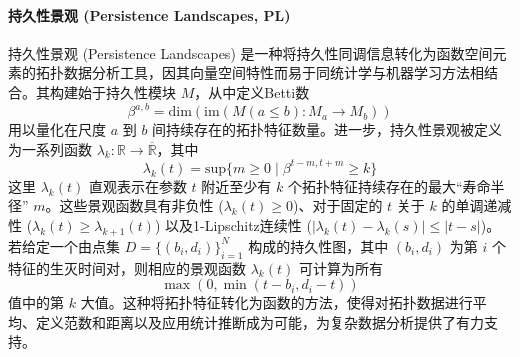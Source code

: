             \paragraph{持久性景观 (Persistence Landscapes, PL)}
                \label{sec:feat_pl}
                持久性景观 (Persistence Landscapes) \cite{1} 是一种将持久性同调信息转化为函数空间元素的拓扑数据分析工具，因其向量空间特性而易于同统计学与机器学习方法相结合。其构建始于持久性模块 $M$，从中定义Betti数
                \begin{equation}
                \label{eq:betti_number} %
                \beta^{a,b} = \text{dim}(\text{im}(M(a \le b): M_a \rightarrow M_b))
                \end{equation}
                用以量化在尺度 $a$ 到 $b$ 间持续存在的拓扑特征数量。进一步，持久性景观被定义为一系列函数 $\lambda_k: \mathbb{R} \rightarrow \overline{\mathbb{R}}$，其中
                \begin{equation}
                \label{eq:lambda_k_definition}
                \lambda_k(t) = \text{sup}\{m \ge 0 \mid \beta^{t-m,t+m} \ge k\}
                \end{equation}
                这里 $\lambda_k(t)$ 直观表示在参数 $t$ 附近至少有 $k$ 个拓扑特征持续存在的最大“寿命半径” $m$。这些景观函数具有非负性 ($\lambda_k(t) \ge 0$)、对于固定的 $t$ 关于 $k$ 的单调递减性 ($\lambda_k(t) \ge \lambda_{k+1}(t)$) 以及1-Lipschitz连续性 ($|\lambda_k(t) - \lambda_k(s)| \le |t-s|$)。若给定一个由点集 $D = \{(b_i, d_i)\}_{i=1}^N$ 构成的持久性图，其中 $(b_i,d_i)$ 为第 $i$ 个特征的生灭时间对，则相应的景观函数 $\lambda_k(t)$ 可计算为所有
                \begin{equation}
                \label{eq:lambda_k_from_diagram_core}
                \max(0, \min(t-b_i, d_i-t))
                \end{equation}
                值中的第 $k$ 大值。这种将拓扑特征转化为函数的方法，使得对拓扑数据进行平均、定义范数和距离以及应用统计推断成为可能，为复杂数据分析提供了有力支持。
                


